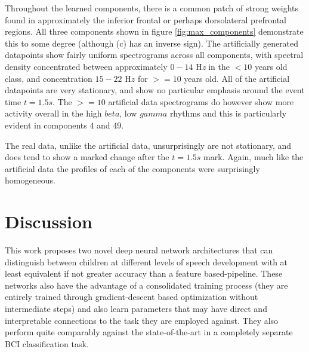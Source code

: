 \documentclass[fleqn,10pt]{wlscirep}
\begin{document}
Throughout the learned components, there is a common patch of strong weights found in approximately the inferior frontal or perhaps dorsolateral prefrontal regions. All three components shown in figure \ref{fig:max_components} demonstrate this to some degree (although (c) has an inverse sign). The artificially generated datapoints show fairly uniform spectrograms across all components, with spectral density concentrated between approximately $0-14$ H{\em z} in the $<10$ years old class, and concentration $15-22$ H$z$ for $>=10$ years old. All of the artificial datapoints are very stationary, and show no particular emphasis around the event time $t=1.5s$. The $>=10$ artificial data spectrograms do however show more activity overall in the high $beta$, low $gamma$ rhythms and this is particularly evident in components 4 and 49.

The real data, unlike the artificial data, unsurprisingly are not stationary, and does tend to show a marked change after the $t=1.5s$ mark. Again, much like the artificial data the profiles of each of the components were surprisingly homogeneous.

\section*{Discussion}

This work proposes two novel deep neural network architectures that can distinguish between children at different levels of speech development with at least equivalent if not greater accuracy than a feature based-pipeline. These networks also have the advantage of a consolidated training process (they are entirely trained through gradient-descent based optimization without intermediate steps) and also learn parameters that may have direct and interpretable connections to the task they are employed against. They also perform quite comparably against the state-of-the-art in a completely separate BCI classification task. 

\end{document}

